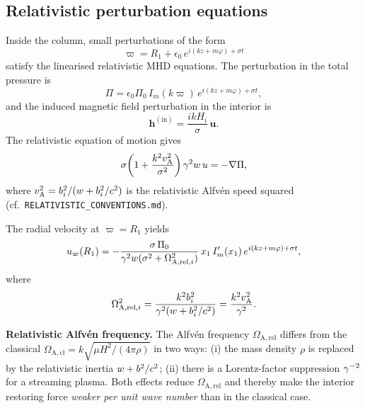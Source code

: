 \subsection{Relativistic perturbation equations}
\label{sec:rel-115-pert}

Inside the column, small perturbations of the form
\begin{equation}
\label{eq:rel-115-mode}
\varpi = R_{1} + \epsilon_{0}\,e^{i(kz + m\varphi) + \sigma t}
\end{equation}
satisfy the linearised relativistic MHD equations.  The perturbation
in the total pressure is
\begin{equation}
\label{eq:rel-115-Pipert}
\Pi = \epsilon_{0}\Pi_{0}\,I_{m}(k\varpi)\,
  e^{i(kz+m\varphi)+\sigma t},
\end{equation}
and the induced magnetic field perturbation in the interior is
\begin{equation}
\label{eq:rel-115-hin}
\mathbf{h}^{(\mathrm{in})}
  = \frac{ik H_{i}}{\sigma}\,\mathbf{u}.
\end{equation}
The relativistic equation of motion gives
\begin{equation}
\label{eq:rel-115-ueq}
\sigma\!\left(1
  + \frac{k^{2}v_{\mathrm{A}}^{2}}{\sigma^{2}}\right)
  \gamma^{2}w\,u
  = -\nabla\Pi,
\end{equation}
where $v_{\mathrm{A}}^{2} = b_{i}^{2}/(w + b_{i}^{2}/c^{2})$ is the
relativistic Alfv\'en speed squared (cf.\
\texttt{RELATIVISTIC\_CONVENTIONS.md}).

The radial velocity at $\varpi = R_{1}$ yields
\begin{equation}
\label{eq:rel-115-ur}
u_{\varpi}(R_{1})
  = -\frac{\sigma\,\Pi_{0}}
    {\gamma^{2}w(\sigma^{2}+\Omega_{\mathrm{A,rel},i}^{2})}
  \,x_{1}\,I'_{m}(x_{1})\,
  e^{i(kz+m\varphi)+\sigma t},
\end{equation}
where
\begin{equation}
\label{eq:rel-115-OmA}
\Omega_{\mathrm{A,rel},i}^{2}
  = \frac{k^{2}b_{i}^{2}}{\gamma^{2}(w + b_{i}^{2}/c^{2})}
  = \frac{k^{2}v_{\mathrm{A}}^{2}}{\gamma^{2}}.
\end{equation}

\begin{relcorrection}
\textbf{Relativistic Alfv\'en frequency.}
The Alfv\'en frequency $\Omega_{\mathrm{A,rel}}$ differs from the
classical $\Omega_{\mathrm{A,cl}} = k\sqrt{\mu H^{2}/(4\pi\rho)}$
in two ways: (i) the mass density $\rho$ is replaced by the
relativistic inertia $w + b^{2}/c^{2}$; (ii) there is a
Lorentz-factor suppression $\gamma^{-2}$ for a streaming plasma.  Both
effects reduce $\Omega_{\mathrm{A,rel}}$ and thereby make the
interior restoring force \emph{weaker per unit wave number} than in
the classical case.
\end{relcorrection}

